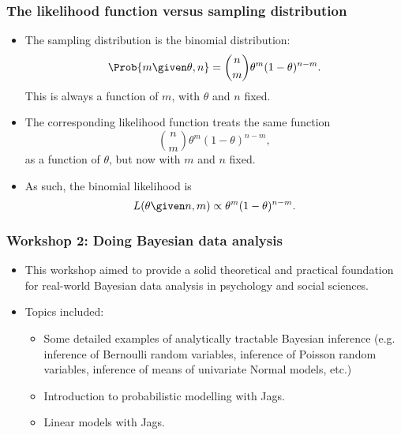 \begin{frame}
	\frametitle{The likelihood function versus sampling distribution}
		\begin{itemize}
			\item The sampling distribution is the binomial distribution:
				\[\Prob{m \given \theta,n} = \binom{n}{m} \theta^m (1-\theta)^{n-m}.\]
				This is always a function of $m$, with $\theta$ and $n$ fixed.
			\item The corresponding likelihood function treats the same function
				\[\binom{n}{m} \theta^m (1-\theta)^{n-m},\] 
				as a function of $\theta$, but now with $m$ and $n$ fixed.
			\item As such, the binomial likelihood is 
				\[L(\theta\given n, m) \propto \theta^m (1-\theta)^{n-m}.\]
\end{itemize}
\end{frame}



\begin{frame}
	\frametitle{Workshop 2: Doing Bayesian data analysis}

	\begin{itemize}
		\item This workshop aimed to provide a solid theoretical and practical foundation for real-world Bayesian data analysis in psychology and social sciences.
		\item Topics included:
			\begin{itemize}
				\item Some detailed examples of analytically tractable Bayesian inference (e.g. inference of Bernoulli random variables, inference of Poisson random variables, inference of means of univariate Normal models, etc.)
				\item Introduction to probabilistic modelling with Jags.
				\item Linear models with Jags.
			\end{itemize}

	\end{itemize}

\end{frame}

